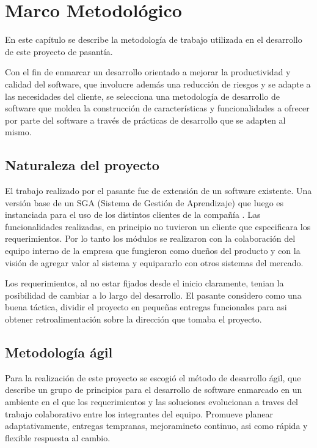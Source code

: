 \chapter{Marco Metodológico}
\thispagestyle{empty} %

En este capítulo se describe la metodología de trabajo utilizada en el desarrollo de este proyecto de pasantía.

Con el fin de enmarcar un desarrollo orientado a mejorar la productividad y calidad del software, que involucre además una reducción de riesgos y se adapte a las necesidades del cliente, se selecciona una metodología de desarrollo de software que moldea la construcción de características y funcionalidades a ofrecer por parte del software a través de prácticas de desarrollo que se adapten al mismo.

\section{Naturaleza del proyecto}
El trabajo realizado por el pasante fue de extensión de un software existente. Una versión base de un SGA (Sistema de Gestión de Aprendizaje) que luego es instanciada para el uso de los distintos clientes de la compañía
. Las funcionalidades realizadas, en principio no tuvieron un cliente que especificara los requerimientos. Por lo tanto los módulos se realizaron con la colaboración del equipo interno de la empresa que fungieron como dueños del producto y con la visión de agregar valor al sistema y equipararlo con otros sistemas del mercado.

Los requerimientos, al no estar fijados desde el inicio claramente, tenian la posibilidad de cambiar a lo largo del desarrollo. El pasante considero como una buena táctica, dividir el proyecto en pequeñas entregas funcionales para asi obtener retroalimentación sobre la dirección que tomaba el proyecto.

\section{Metodología ágil}

Para la realización de este proyecto se escogió el método de desarrollo ágil, que describe un grupo de principios para el desarrollo de software enmarcado en un ambiente en el que los requerimientos  y las soluciones evolucionan a traves del trabajo colaborativo entre los integrantes del equipo. Promueve planear adaptativamente, entregas tempranas, mejoramineto continuo, asi como rápida y flexible respuesta al cambio.

